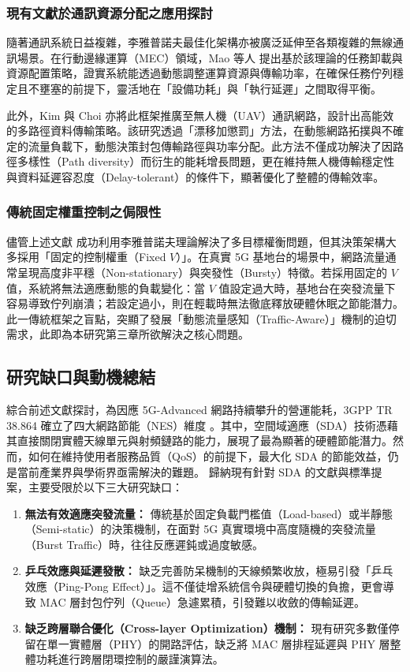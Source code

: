 \subsubsection{現有文獻於通訊資源分配之應用探討}
隨著通訊系統日益複雜，李雅普諾夫最佳化架構亦被廣泛延伸至各類複雜的無線通訊場景。在行動邊緣運算（MEC）領域，Mao 等人 \cite{mao2016_power_delay} 提出基於該理論的任務卸載與資源配置策略，證實系統能透過動態調整運算資源與傳輸功率，在確保任務佇列穩定且不壅塞的前提下，靈活地在「設備功耗」與「執行延遲」之間取得平衡。

此外，Kim 與 Choi \cite{kim2021_lyapunov_uav} 亦將此框架推廣至無人機（UAV）通訊網路，設計出高能效的多路徑資料傳輸策略。該研究透過「漂移加懲罰」方法，在動態網路拓撲與不確定的流量負載下，動態決策封包傳輸路徑與功率分配。此方法不僅成功解決了因路徑多樣性（Path diversity）而衍生的能耗增長問題，更在維持無人機傳輸穩定性與資料延遲容忍度（Delay-tolerant）的條件下，顯著優化了整體的傳輸效率。

\subsubsection{傳統固定權重控制之侷限性}
儘管上述文獻 \cite{mao2016_power_delay}\cite{kim2021_lyapunov_uav} 成功利用李雅普諾夫理論解決了多目標權衡問題，但其決策架構大多採用「固定的控制權重（Fixed $V$）」。在真實 5G 基地台的場景中，網路流量通常呈現高度非平穩（Non-stationary）與突發性（Bursty）特徵。若採用固定的 $V$ 值，系統將無法適應動態的負載變化：當 $V$ 值設定過大時，基地台在突發流量下容易導致佇列崩潰；若設定過小，則在輕載時無法徹底釋放硬體休眠之節能潛力。此一傳統框架之盲點，突顯了發展「動態流量感知（Traffic-Aware）」機制的迫切需求，此即為本研究第三章所欲解決之核心問題。

\subsection{研究缺口與動機總結}
綜合前述文獻探討，為因應 5G-Advanced 網路持續攀升的營運能耗，3GPP TR 38.864 確立了四大網路節能（NES）維度 \cite{3gpp2023_tr38864}。其中，空間域適應（SDA）技術憑藉其直接關閉實體天線單元與射頻鏈路的能力，展現了最為顯著的硬體節能潛力。然而，如何在維持使用者服務品質（QoS）的前提下，最大化 SDA 的節能效益，仍是當前產業界與學術界亟需解決的難題。
歸納現有針對 SDA 的文獻與標準提案，主要受限於以下三大研究缺口：
\begin{enumerate}
    \item \textbf{無法有效適應突發流量：} 傳統基於固定負載門檻值（Load-based）或半靜態（Semi-static）的決策機制，在面對 5G 真實環境中高度隨機的突發流量（Burst Traffic）時，往往反應遲鈍或過度敏感。
    \item \textbf{乒乓效應與延遲發散：} 缺乏完善防呆機制的天線頻繁收放，極易引發「乒乓效應（Ping-Pong Effect）」。這不僅徒增系統信令與硬體切換的負擔，更會導致 MAC 層封包佇列（Queue）急遽累積，引發難以收斂的傳輸延遲。
    \item \textbf{缺乏跨層聯合優化（Cross-layer Optimization）機制：} 現有研究多數僅停留在單一實體層（PHY）的開路評估，缺乏將 MAC 層排程延遲與 PHY 層整體功耗進行跨層閉環控制的嚴謹演算法。
\end{enumerate}

